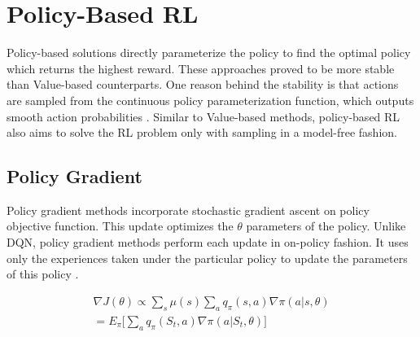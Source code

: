 \section{Policy-Based RL}

Policy-based solutions directly parameterize the policy to find the optimal policy which returns the highest reward. These approaches proved to be more stable than Value-based counterparts. One reason behind the stability is that actions are sampled from the continuous policy parameterization function, which outputs smooth action probabilities \cite{Sutton2018}. Similar to Value-based methods, policy-based RL also aims to solve the RL problem only with sampling in a model-free fashion.

\subsection{Policy Gradient}

Policy gradient methods incorporate stochastic gradient ascent on policy objective function. This update optimizes the \(\theta\) parameters of the policy. Unlike DQN, policy gradient methods perform each update in on-policy fashion. It uses only the experiences taken under the particular policy to update the parameters of this policy \cite{SpinningUp2018}.

\begin{align}
    \nabla J(\theta) \propto \sum\limits_s \mu(s) \sum\limits_a q_{\pi}(s,a)\nabla \pi(a | s, \theta)\\
    = E_{\pi} \Big[\sum\limits_a q_{\pi}(S_t,a)\nabla\pi(a | S_t, \theta)\Big]
\end{align}
